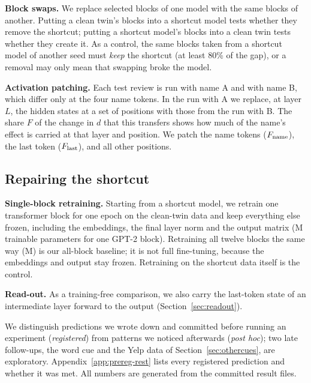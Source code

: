 \textbf{Block swaps.} We replace selected blocks of one model with the same blocks of another. Putting a clean twin's
blocks into a shortcut model tests whether they remove the shortcut; putting a shortcut model's blocks into a clean
twin tests whether they create it. As a control, the same blocks taken from a shortcut model of another seed must
\emph{keep} the shortcut (at least 80\% of the gap), or a removal may only mean that swapping broke the model.

\textbf{Activation patching.} Each test review is run with name A and with name B, which differ only at the four name
tokens. In the run with A we replace, at layer $L$, the hidden states at a set of positions with those from the run
with B. The share $F$ of the change in $d$ that this transfers shows how much of the name's effect is carried at that
layer and position. We patch the name tokens ($F_{\text{name}}$), the last token ($F_{\text{last}}$), and all other positions.

\subsection{Repairing the shortcut}
\textbf{Single-block retraining.} Starting from a shortcut model, we retrain one transformer block for one epoch on
the clean-twin data and keep everything else frozen, including the embeddings, the final layer norm and the output
matrix (\retrainParamsOneBlockFullFT{}M trainable parameters for one GPT-2 block). Retraining all twelve blocks the
same way (\retrainParamsAllFullFT{}M) is our all-block baseline; it is not full fine-tuning, because the embeddings and
output stay frozen. Retraining on the shortcut data itself is the control.

\textbf{Read-out.} As a training-free comparison, we also carry the last-token state of an intermediate layer forward
to the output (Section~\ref{sec:readout}).

We distinguish predictions we wrote down and committed before running an experiment (\emph{registered}) from patterns
we noticed afterwards (\emph{post hoc}); two late follow-ups, the word cue and the Yelp data of
Section~\ref{sec:othercues}, are exploratory. Appendix~\ref{app:prereg-rest} lists every registered prediction and
whether it was met. All numbers are generated from the committed result files.
